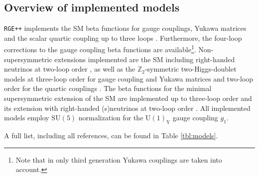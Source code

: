 \documentclass[11pt,a4paper]{article}
\begin{document}
\subsection{\label{sec::overview}Overview of implemented models}
\texttt{RGE++} implements the SM beta functions for gauge couplings, Yukawa matrices and the scalar quartic coupling up to three loops \cite{Machacek:1983tz,Machacek:1983fi,Machacek:1984zw,
                               Mihaila:2012fm,Mihaila:2012pz,Bednyakov:2012rb,Chetyrkin:2012rz,Bednyakov:2012en,Bednyakov:2014pia,Herren:2017uxn,Chetyrkin:2013wya,Bednyakov:2013eba,Bednyakov:2013cpa}.
Furthermore, the four-loop corrections to the gauge coupling beta functions \cite{Davies:2019onf} are available\footnote{Note that in \cite{Davies:2019onf} only third generation Yukawa couplings are taken into account.}.
Non-supersymmetric extensions implemented are the SM including right-handed neutrinos at two-loop order \cite{Machacek:1983tz,Machacek:1983fi,Machacek:1984zw, Antusch:2005gp, Grzadkowski:1987tf}, as well as
the $\mathbb{Z}_2$-symmetric two-Higgs-doublet models at three-loop order for gauge coupling and Yukawa matrices and two-loop order for the quartic couplings
\cite{Machacek:1983tz,Machacek:1983fi,Machacek:1984zw, Herren:2017uxn, Chowdhury:2015yja}.
The beta functions for the minimal supersymmetric extension of the SM are implemented up to three-loop order \cite{Martin:1993zk,Ferreira:1996ug} and its extension with right-handed (s)neutrinos at two-loop order
\cite{Martin:1993zk,Antusch:2005gp,Grzadkowski:1987wr}. All implemented models employ $\mathrm{SU}(5)$ normalization for the $\mathrm{U}(1)_\mathrm{Y}$ gauge coupling $g_1$.

A full list, including all references, can be found in Table \ref{tbl:models}.
\end{document}
